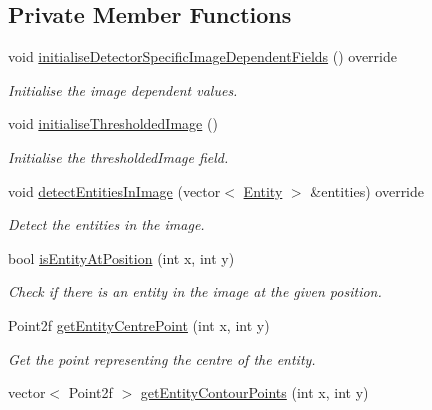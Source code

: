 \subsection*{Private Member Functions}
\begin{DoxyCompactItemize}
\item 
void \hyperlink{classmultiscale_1_1analysis_1_1SimulationClusterDetector_a1f5127621294426b6406985dccb292cd}{initialise\-Detector\-Specific\-Image\-Dependent\-Fields} () override
\begin{DoxyCompactList}\small\item\em Initialise the image dependent values. \end{DoxyCompactList}\item 
void \hyperlink{classmultiscale_1_1analysis_1_1SimulationClusterDetector_ae36c793acaa548cc3ce74f72621d8bd7}{initialise\-Thresholded\-Image} ()
\begin{DoxyCompactList}\small\item\em Initialise the thresholded\-Image field. \end{DoxyCompactList}\item 
void \hyperlink{classmultiscale_1_1analysis_1_1SimulationClusterDetector_af3c2206724a69794e12f34fe7fe5082b}{detect\-Entities\-In\-Image} (vector$<$ \hyperlink{classmultiscale_1_1analysis_1_1Entity}{Entity} $>$ \&entities) override
\begin{DoxyCompactList}\small\item\em Detect the entities in the image. \end{DoxyCompactList}\item 
bool \hyperlink{classmultiscale_1_1analysis_1_1SimulationClusterDetector_a886031cb8d576c4cf380c1105eeee4d2}{is\-Entity\-At\-Position} (int x, int y)
\begin{DoxyCompactList}\small\item\em Check if there is an entity in the image at the given position. \end{DoxyCompactList}\item 
Point2f \hyperlink{classmultiscale_1_1analysis_1_1SimulationClusterDetector_a083c8ff51e483d86744961aca1ae3551}{get\-Entity\-Centre\-Point} (int x, int y)
\begin{DoxyCompactList}\small\item\em Get the point representing the centre of the entity. \end{DoxyCompactList}\item 
vector$<$ Point2f $>$ \hyperlink{classmultiscale_1_1analysis_1_1SimulationClusterDetector_ae51328d7fe0e477dea162c7e99da45c2}{get\-Entity\-Contour\-Points} (int x, int y)

\end{DoxyCompactItemize}
